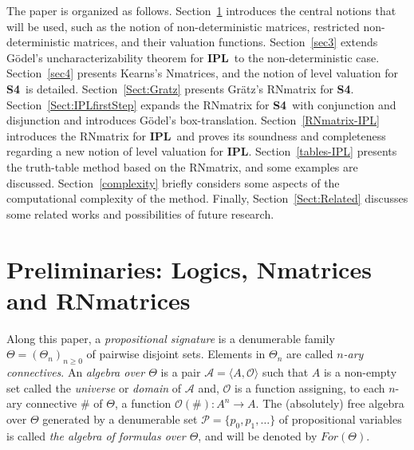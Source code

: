 \documentclass[12pt]{article}
\newcommand{\ipl}{\ensuremath{\mathbf{IPL}}}
\newcommand{\sfo}{\textbf{S4}}
\begin{document}
The paper is organized as follows. Section~\ref{sec2} introduces the central notions that will be used, such as the notion of non-deterministic matrices, restricted non-deterministic matrices, and their valuation functions. Section~\ref{sec3} extends G\"odel's uncharacterizability theorem for \ipl\ to the non-deterministic case. Section~\ref{sec4} presents Kearns's Nmatrices, and the notion of level valuation for \sfo\ is detailed. Section~\ref{Sect:Gratz} presents Gr\"atz's RNmatrix for \sfo. Section~\ref{Sect:IPLfirstStep} expands the RNmatrix for \sfo\ with conjunction and disjunction and introduces G\"odel's box-translation. Section~\ref{RNmatrix-IPL} introduces the RNmatrix for \ipl\ and proves its soundness and completeness regarding a new notion of level valuation for \ipl. Section~\ref{tables-IPL} presents the truth-table method based on the RNmatrix, and some examples are discussed. Section~\ref{complexity} briefly considers some aspects of the computational complexity of the method. Finally, Section~\ref{Sect:Related} discusses some related works and possibilities of future research.

\section{Preliminaries: Logics, Nmatrices and RNmatrices}\label{sec2}

 
Along this paper, a {\em propositional signature} is a denumerable family $\Theta=(\Theta_n)_{n \geq 0}$ of pairwise disjoint sets. Elements in $\Theta_n$ are called {\em $n$-ary connectives}. An {\em algebra over $\Theta$} is a pair $\mathcal{A}=\langle A,\mathcal{O}\rangle$ such that  $A$ is a non-empty set called the {\em universe} or {\em domain} of $\mathcal{A}$ and, $\mathcal{O}$ is a function assigning, to each $n$-ary connective $\#$ of $\Theta$, a function $\mathcal{O}(\#) : A^{n} \rightarrow A$.
The (absolutely) free algebra over $\Theta$ generated by a denumerable set $\mathcal{P}=\{p_0,p_1,\ldots\}$ of propositional variables is called {\em the algebra of formulas over $\Theta$}, and will be denoted by $For(\Theta)$. 
\end{document}
